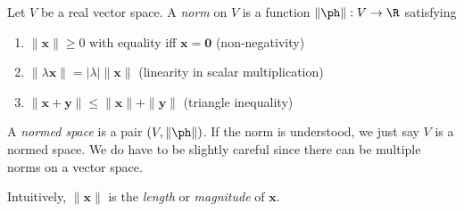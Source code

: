 \documentclass[a4paper]{article}
\begin{document}
\begin{defi}
  Let $V$ be a real vector space. A \emph{norm} on $V$ is a function $\|\ph \|: V\to \R$ satisfying
  \begin{enumerate}
    \item $\|\mathbf{x}\| \geq 0$ with equality iff $\mathbf{x} = \mathbf{0}$ \hfill (non-negativity)
    \item $\|\lambda \mathbf{x}\| = |\lambda|\|\mathbf{x}\|$ \hfill (linearity in scalar multiplication)
    \item $\|\mathbf{x} + \mathbf{y}\| \leq \|\mathbf{x} \| + \|\mathbf{y}\|$ \hfill (triangle inequality)
  \end{enumerate}
  A \emph{normed space} is a pair $(V, \|\ph \|)$. If the norm is understood, we just say $V$ is a normed space. We do have to be slightly careful since there can be multiple norms on a vector space.
\end{defi}
Intuitively, $\|\mathbf{x}\|$ is the \emph{length} or \emph{magnitude} of $\mathbf{x}$.
\end{document}
